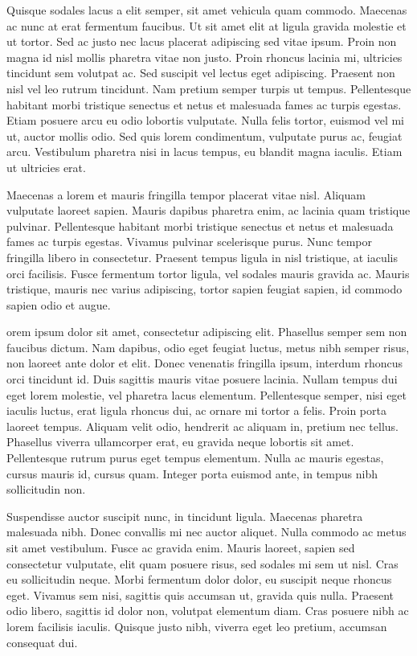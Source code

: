 \documentclass[10pt, a4paper, conference]{IEEEtran}
\begin{document}
Quisque sodales lacus a elit semper, sit amet vehicula quam commodo. Maecenas ac nunc at erat fermentum faucibus. Ut sit amet elit at ligula gravida molestie et ut tortor. Sed ac justo nec lacus placerat adipiscing sed vitae ipsum. Proin non magna id nisl mollis pharetra vitae non justo. Proin rhoncus lacinia mi, ultricies tincidunt sem volutpat ac. Sed suscipit vel lectus eget adipiscing. Praesent non nisl vel leo rutrum tincidunt. Nam pretium semper turpis ut tempus. Pellentesque habitant morbi tristique senectus et netus et malesuada fames ac turpis egestas. Etiam posuere arcu eu odio lobortis vulputate. Nulla felis tortor, euismod vel mi ut, auctor mollis odio. Sed quis lorem condimentum, vulputate purus ac, feugiat arcu. Vestibulum pharetra nisi in lacus tempus, eu blandit magna iaculis. Etiam ut ultricies erat.

Maecenas a lorem et mauris fringilla tempor placerat vitae nisl. Aliquam vulputate laoreet sapien. Mauris dapibus pharetra enim, ac lacinia quam tristique pulvinar. Pellentesque habitant morbi tristique senectus et netus et malesuada fames ac turpis egestas. Vivamus pulvinar scelerisque purus. Nunc tempor fringilla libero in consectetur. Praesent tempus ligula in nisl tristique, at iaculis orci facilisis. Fusce fermentum tortor ligula, vel sodales mauris gravida ac. Mauris tristique, mauris nec varius adipiscing, tortor sapien feugiat sapien, id commodo sapien odio et augue.

orem ipsum dolor sit amet, consectetur adipiscing elit. Phasellus semper sem non faucibus dictum. Nam dapibus, odio eget feugiat luctus, metus nibh semper risus, non laoreet ante dolor et elit. Donec venenatis fringilla ipsum, interdum rhoncus orci tincidunt id. Duis sagittis mauris vitae posuere lacinia. Nullam tempus dui eget lorem molestie, vel pharetra lacus elementum. Pellentesque semper, nisi eget iaculis luctus, erat ligula rhoncus dui, ac ornare mi tortor a felis. Proin porta laoreet tempus. Aliquam velit odio, hendrerit ac aliquam in, pretium nec tellus. Phasellus viverra ullamcorper erat, eu gravida neque lobortis sit amet. Pellentesque rutrum purus eget tempus elementum. Nulla ac mauris egestas, cursus mauris id, cursus quam. Integer porta euismod ante, in tempus nibh sollicitudin non.

Suspendisse auctor suscipit nunc, in tincidunt ligula. Maecenas pharetra malesuada nibh. Donec convallis mi nec auctor aliquet. Nulla commodo ac metus sit amet vestibulum. Fusce ac gravida enim. Mauris laoreet, sapien sed consectetur vulputate, elit quam posuere risus, sed sodales mi sem ut nisl. Cras eu sollicitudin neque. Morbi fermentum dolor dolor, eu suscipit neque rhoncus eget. Vivamus sem nisi, sagittis quis accumsan ut, gravida quis nulla. Praesent odio libero, sagittis id dolor non, volutpat elementum diam. Cras posuere nibh ac lorem facilisis iaculis. Quisque justo nibh, viverra eget leo pretium, accumsan consequat dui.
\end{document}
